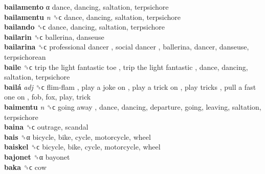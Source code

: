 \textbf{bailamento} α  dance, dancing, saltation, terpsichore  \\
\textbf{bailamentu} \emph{n}  ␝ϲ  dance, dancing, saltation, terpsichore  \\
\textbf{bailando} ␝ϲ  dance, dancing, saltation, terpsichore  \\
\textbf{bailarin} ␝ϲ  ballerina, danseuse  \\
\textbf{bailarina} ␝ϲ   professional dancer ,  social dancer , ballerina, dancer, danseuse, terpsichorean  \\
\textbf{baile} ␝ϲ   trip the light fantastic toe ,  trip the light fantastic , dance, dancing, saltation, terpsichore  \\
\textbf{bailá} \emph{adj}  ␝ϲ   flim-flam ,  play a joke on ,  play a trick on ,  play tricks ,  pull a fast one on , fob, fox, play, trick  \\
\textbf{baimentu} \emph{n}  ␝ϲ   going away , dance, dancing, departure, going, leaving, saltation, terpsichore  \\
\textbf{baina} ␝ϲ  outrage, scandal  \\
\textbf{bais} ␝α  bicycle, bike, cycle, motorcycle, wheel  \\
\textbf{baiskel} ␝ϲ  bicycle, bike, cycle, motorcycle, wheel  \\
\textbf{bajonet} ␝α  bayonet  \\
\textbf{baka} ␝ϲ  cow  \\
